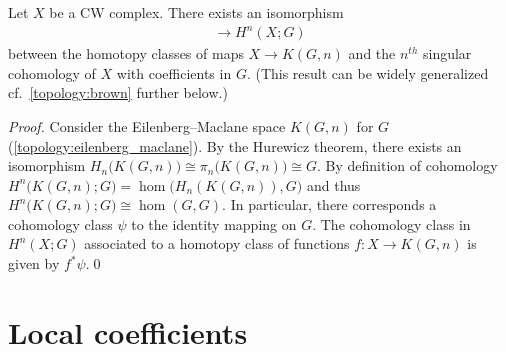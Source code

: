     \begin{property}[Representability]
        Let $X$ be a CW complex. There exists an isomorphism
        \begin{gather}
            [X,K(G,n)]\rightarrow H^n(X;G)
        \end{gather}
        between the homotopy classes of maps $X\rightarrow K(G,n)$ and the $n^{th}$ singular cohomology of $X$ with coefficients in $G$. (This result can be widely generalized cf.~\cref{topology:brown} further below.)
        \begin{mdframed}[roundcorner=10pt, linecolor=blue, linewidth=1pt]
            \begin{proof}
                Consider the Eilenberg--Maclane space $K(G,n)$ for $G$ (\cref{topology:eilenberg_maclane}). By the Hurewicz theorem, there exists an isomorphism $H_n\big(K(G,n)\big)\cong\pi_n\big(K(G,n)\big)\cong G$. By definition of cohomology $H^n\big(K(G,n);G\big)=\hom\big(H_n(K(G,n)),G\big)$ and thus $H^n\big(K(G,n);G\big)\cong\hom(G,G)$. In particular, there corresponds a cohomology class $\psi$ to the identity mapping on $G$. The cohomology class in $H^n(X;G)$ associated to a homotopy class of functions $f:X\rightarrow K(G,n)$ is given by $f^*\psi$.\qed
            \end{proof}
        \end{mdframed}
    \end{property}

\section{Local coefficients}\label{section:local_coefficients}

